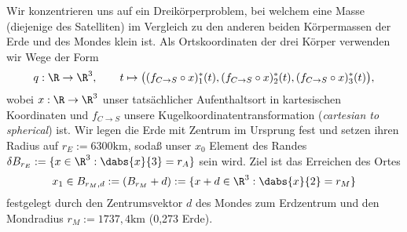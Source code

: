 \documentclass{subfiles}
\begin{document}
    Wir konzentrieren uns auf ein Dreikörperproblem, bei welchem eine Masse (diejenige des Satelliten) im Vergleich zu den anderen beiden Körpermassen der Erde und des Mondes klein ist. Als Ortskoordinaten der drei Körper verwenden wir Wege der Form 
    \[
        q:\R\to\R^3,\qquad t\mapsto \bigl((f_{C\to S}\circ x)_1^*(t),(f_{C\to S}\circ x)_2^*(t),(f_{C\to S}\circ x)_3^*(t)\bigr),
    \]
    wobei $x:\R\to\R^3$ unser tatsächlicher Aufenthaltsort in kartesischen Koordinaten und $f_{C\to S}$ unsere Kugelkoordinatentransformation (\emph{cartesian to spherical}) ist. Wir legen die Erde mit Zentrum im Ursprung fest und setzen ihren Radius auf $r_E:=6300\si{\kilo\metre}$, sodaß unser $x_0$ Element des Randes $\delta B_{r_E}:=\{x\in\R^3:\dabs{x}{3} = r_A\}$ sein wird. Ziel ist das Erreichen des Ortes
    \[
        x_1\in B_{r_M,d}:=(B_{r_M}+d):=\{x + d\in\R^3:\dabs{x}{2} = r_M\}
    \]
    festgelegt durch den Zentrumsvektor $d$ des Mondes zum Erdzentrum und den Mondradius $r_M:=1 737,4\si{\kilo\metre}$ (0,273 Erde).
\end{document}

